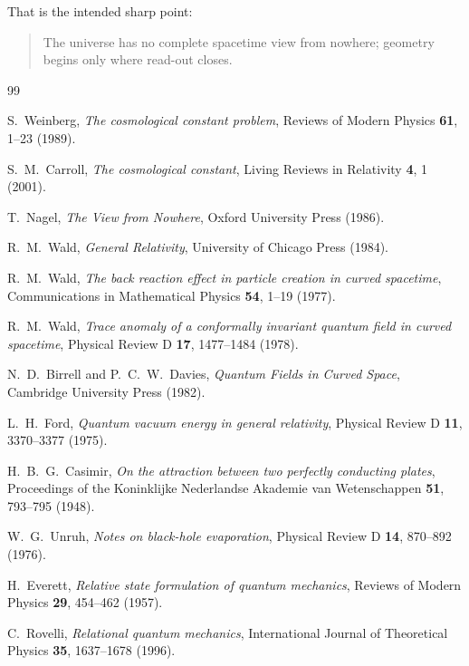 \documentclass[12pt,a4paper]{article}
\theoremstyle{definition}
\theoremstyle{remark}
\begin{document}
That is the intended sharp point:

\begin{quote}
The universe has no complete spacetime view from nowhere; geometry begins only where read-out closes.
\end{quote}

\begin{thebibliography}{99}

S.~Weinberg, \emph{The cosmological constant problem}, Reviews of Modern Physics \textbf{61}, 1--23 (1989).

S.~M.~Carroll, \emph{The cosmological constant}, Living Reviews in Relativity \textbf{4}, 1 (2001).

T.~Nagel, \emph{The View from Nowhere}, Oxford University Press (1986).

R.~M.~Wald, \emph{General Relativity}, University of Chicago Press (1984).

R.~M.~Wald, \emph{The back reaction effect in particle creation in curved spacetime}, Communications in Mathematical Physics \textbf{54}, 1--19 (1977).

R.~M.~Wald, \emph{Trace anomaly of a conformally invariant quantum field in curved spacetime}, Physical Review D \textbf{17}, 1477--1484 (1978).

N.~D.~Birrell and P.~C.~W.~Davies, \emph{Quantum Fields in Curved Space}, Cambridge University Press (1982).

L.~H.~Ford, \emph{Quantum vacuum energy in general relativity}, Physical Review D \textbf{11}, 3370--3377 (1975).

H.~B.~G.~Casimir, \emph{On the attraction between two perfectly conducting plates}, Proceedings of the Koninklijke Nederlandse Akademie van Wetenschappen \textbf{51}, 793--795 (1948).

W.~G.~Unruh, \emph{Notes on black-hole evaporation}, Physical Review D \textbf{14}, 870--892 (1976).

H.~Everett, \emph{Relative state formulation of quantum mechanics}, Reviews of Modern Physics \textbf{29}, 454--462 (1957).

C.~Rovelli, \emph{Relational quantum mechanics}, International Journal of Theoretical Physics \textbf{35}, 1637--1678 (1996).


\end{thebibliography}
\end{document}
